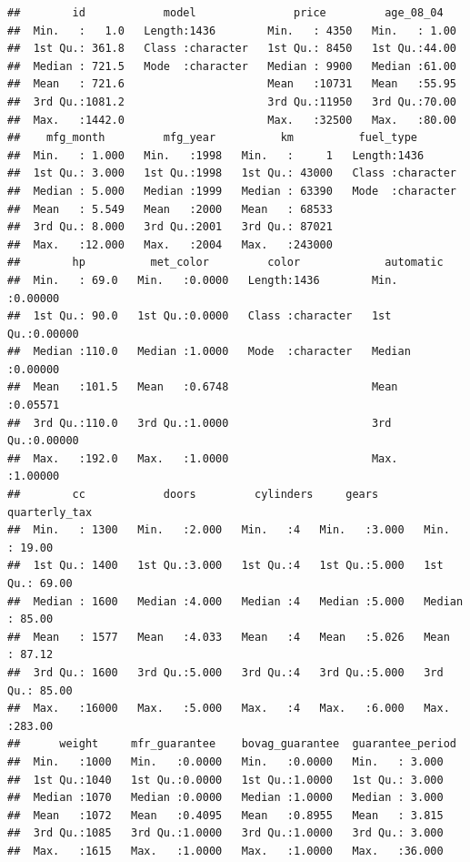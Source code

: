 \documentclass[
]{article}
\begin{document}
\begin{verbatim}
##        id            model               price         age_08_04    
##  Min.   :   1.0   Length:1436        Min.   : 4350   Min.   : 1.00  
##  1st Qu.: 361.8   Class :character   1st Qu.: 8450   1st Qu.:44.00  
##  Median : 721.5   Mode  :character   Median : 9900   Median :61.00  
##  Mean   : 721.6                      Mean   :10731   Mean   :55.95  
##  3rd Qu.:1081.2                      3rd Qu.:11950   3rd Qu.:70.00  
##  Max.   :1442.0                      Max.   :32500   Max.   :80.00  
##    mfg_month         mfg_year          km          fuel_type        
##  Min.   : 1.000   Min.   :1998   Min.   :     1   Length:1436       
##  1st Qu.: 3.000   1st Qu.:1998   1st Qu.: 43000   Class :character  
##  Median : 5.000   Median :1999   Median : 63390   Mode  :character  
##  Mean   : 5.549   Mean   :2000   Mean   : 68533                     
##  3rd Qu.: 8.000   3rd Qu.:2001   3rd Qu.: 87021                     
##  Max.   :12.000   Max.   :2004   Max.   :243000                     
##        hp          met_color         color             automatic      
##  Min.   : 69.0   Min.   :0.0000   Length:1436        Min.   :0.00000  
##  1st Qu.: 90.0   1st Qu.:0.0000   Class :character   1st Qu.:0.00000  
##  Median :110.0   Median :1.0000   Mode  :character   Median :0.00000  
##  Mean   :101.5   Mean   :0.6748                      Mean   :0.05571  
##  3rd Qu.:110.0   3rd Qu.:1.0000                      3rd Qu.:0.00000  
##  Max.   :192.0   Max.   :1.0000                      Max.   :1.00000  
##        cc            doors         cylinders     gears       quarterly_tax   
##  Min.   : 1300   Min.   :2.000   Min.   :4   Min.   :3.000   Min.   : 19.00  
##  1st Qu.: 1400   1st Qu.:3.000   1st Qu.:4   1st Qu.:5.000   1st Qu.: 69.00  
##  Median : 1600   Median :4.000   Median :4   Median :5.000   Median : 85.00  
##  Mean   : 1577   Mean   :4.033   Mean   :4   Mean   :5.026   Mean   : 87.12  
##  3rd Qu.: 1600   3rd Qu.:5.000   3rd Qu.:4   3rd Qu.:5.000   3rd Qu.: 85.00  
##  Max.   :16000   Max.   :5.000   Max.   :4   Max.   :6.000   Max.   :283.00  
##      weight     mfr_guarantee    bovag_guarantee  guarantee_period
##  Min.   :1000   Min.   :0.0000   Min.   :0.0000   Min.   : 3.000  
##  1st Qu.:1040   1st Qu.:0.0000   1st Qu.:1.0000   1st Qu.: 3.000  
##  Median :1070   Median :0.0000   Median :1.0000   Median : 3.000  
##  Mean   :1072   Mean   :0.4095   Mean   :0.8955   Mean   : 3.815  
##  3rd Qu.:1085   3rd Qu.:1.0000   3rd Qu.:1.0000   3rd Qu.: 3.000  
##  Max.   :1615   Max.   :1.0000   Max.   :1.0000   Max.   :36.000  

\end{verbatim}
\end{document}
